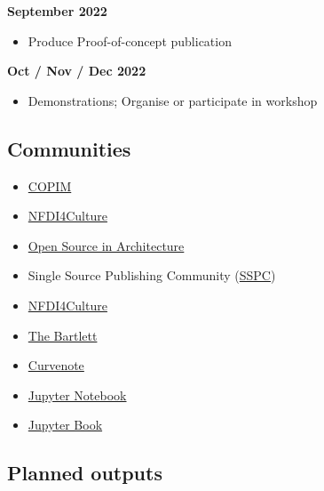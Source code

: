 \documentclass{article}
\begin{document}
\textbf{September 2022}

\begin{itemize}
\item Produce Proof-of-concept publication


\end{itemize}

\textbf{Oct / Nov / Dec 2022}

\begin{itemize}
\item Demonstrations; Organise or participate in workshop


\end{itemize}

\subsection{Communities}\label{H637961}


\begin{itemize}
\item \href{https://www.copim.ac.uk/}{COPIM}


\item \href{https://nfdi4culture.de/index.html}{NFDI4Culture}


\item \href{https://osarch.org/}{Open Source in Architecture}


\item Single Source Publishing Community (\href{https://singlesource.pub/}{SSPC})


\item \href{https://nfdi4culture.de/}{NFDI4Culture}


\item \href{https://www.ucl.ac.uk/bartlett/}{The Bartlett}


\item \href{https://curvenote.com/}{Curvenote}


\item \href{https://jupyter.org/}{Jupyter Notebook }


\item \href{https://jupyterbook.org/en/stable/intro.html}{Jupyter Book}


\end{itemize}

\subsection{Planned outputs}\label{H6024753}
\end{document}
